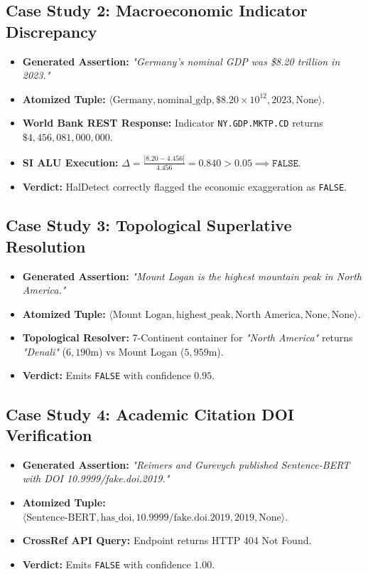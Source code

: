 \subsection{Case Study 2: Macroeconomic Indicator Discrepancy}
\begin{itemize}
    \item \textbf{Generated Assertion:} \textit{"Germany's nominal GDP was \$8.20 trillion in 2023."}
    \item \textbf{Atomized Tuple:} $\langle \text{Germany}, \text{nominal\_gdp}, \$8.20\times 10^{12}, 2023, \text{None} \rangle$.
    \item \textbf{World Bank REST Response:} Indicator \texttt{NY.GDP.MKTP.CD} returns $\$4,456,081,000,000$.
    \item \textbf{SI ALU Execution:} $\Delta = \frac{|8.20 - 4.456|}{4.456} = 0.840 > 0.05 \implies \texttt{FALSE}$.
    \item \textbf{Verdict:} HalDetect correctly flagged the economic exaggeration as \texttt{FALSE}.
\end{itemize}

\subsection{Case Study 3: Topological Superlative Resolution}
\begin{itemize}
    \item \textbf{Generated Assertion:} \textit{"Mount Logan is the highest mountain peak in North America."}
    \item \textbf{Atomized Tuple:} $\langle \text{Mount Logan}, \text{highest\_peak}, \text{North America}, \text{None}, \text{None} \rangle$.
    \item \textbf{Topological Resolver:} 7-Continent container for \textit{"North America"} returns \textit{"Denali"} ($6,190\text{m}$) vs Mount Logan ($5,959\text{m}$).
    \item \textbf{Verdict:} Emits \texttt{FALSE} with confidence $0.95$.
\end{itemize}

\subsection{Case Study 4: Academic Citation DOI Verification}
\begin{itemize}
    \item \textbf{Generated Assertion:} \textit{"Reimers and Gurevych published Sentence-BERT with DOI 10.9999/fake.doi.2019."}
    \item \textbf{Atomized Tuple:} $\langle \text{Sentence-BERT}, \text{has\_doi}, \text{10.9999/fake.doi.2019}, 2019, \text{None} \rangle$.
    \item \textbf{CrossRef API Query:} Endpoint returns HTTP 404 Not Found.
    \item \textbf{Verdict:} Emits \texttt{FALSE} with confidence $1.00$.
\end{itemize}


